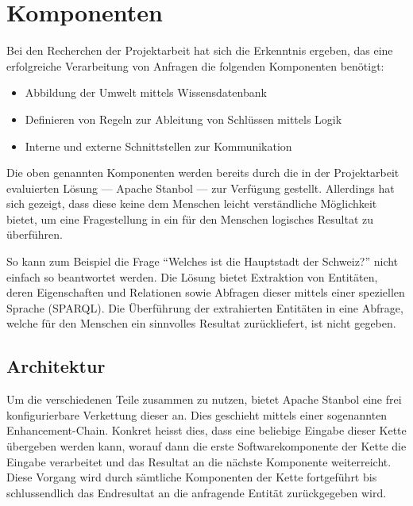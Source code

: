 \chapter{Komponenten}
\label{chap:komponenten}

Bei den Recherchen der Projektarbeit hat sich die Erkenntnis ergeben, das eine erfolgreiche Verarbeitung von Anfragen die folgenden Komponenten benötigt:
\begin{itemize}
	\item Abbildung der Umwelt mittels Wissensdatenbank
	\item Definieren von Regeln zur Ableitung von Schlüssen mittels Logik
	\item Interne und externe Schnittstellen zur Kommunikation
\end{itemize}

Die oben genannten Komponenten werden bereits durch die in der Projektarbeit evaluierten Lösung --- Apache Stanbol --- zur Verfügung gestellt. Allerdings hat sich gezeigt, dass diese keine dem Menschen leicht verständliche Möglichkeit bietet, um eine Fragestellung  in ein für den Menschen logisches Resultat zu überführen.

So kann zum Beispiel die Frage "`Welches ist die Hauptstadt der Schweiz?"' nicht einfach so beantwortet werden. Die Lösung bietet Extraktion von Entitäten, deren Eigenschaften und Relationen sowie Abfragen dieser mittels einer speziellen Sprache (SPARQL). Die Überführung der extrahierten Entitäten in eine Abfrage, welche für den Menschen ein sinnvolles Resultat zurückliefert, ist nicht gegeben.

\section{Architektur}
\label{sec:architektur}
Um die verschiedenen Teile zusammen zu nutzen, bietet Apache Stanbol eine frei konfigurierbare Verkettung dieser an. Dies geschieht mittels einer sogenannten Enhancement-Chain. Konkret heisst dies, dass eine beliebige Eingabe dieser Kette übergeben werden kann, worauf dann die erste Softwarekomponente der Kette die Eingabe verarbeitet und das Resultat an die nächste Komponente weiterreicht. Diese Vorgang wird durch sämtliche Komponenten der Kette fortgeführt bis schlussendlich das Endresultat an die anfragende Entität zurückgegeben wird.




